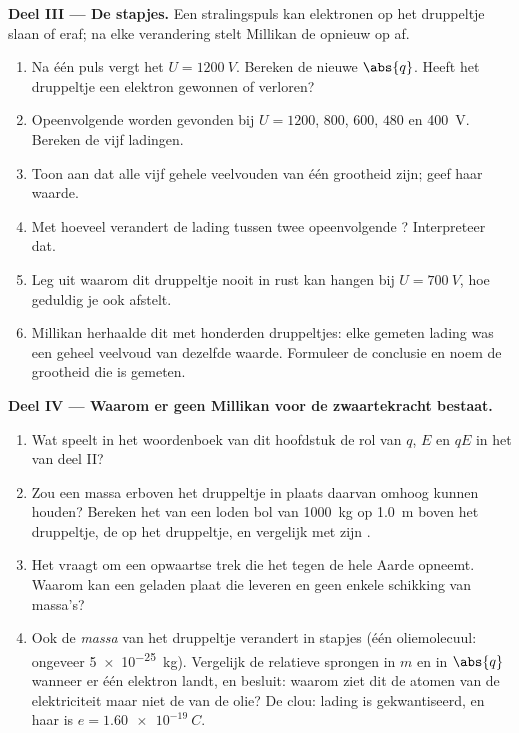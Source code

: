 \begin{problem}
\medskip
\noindent\textbf{Deel III --- De stapjes.}
Een stralingspuls kan elektronen op het druppeltje slaan of eraf; na elke
verandering stelt Millikan de  opnieuw op  af.
\begin{enumerate}[resume]
  \item Na één puls vergt het  $U = \qty{1200}{V}$. Bereken de
        nieuwe $\abs{q}$. Heeft het druppeltje een elektron gewonnen of
        verloren?
  \item Opeenvolgende  worden gevonden bij $U = 1200$, $800$,
        $600$, $480$ en \qty{400}{V}. Bereken de vijf ladingen.
  \item Toon aan dat alle vijf gehele veelvouden van één grootheid zijn;
        geef haar waarde.
  \item Met hoeveel verandert de lading tussen twee opeenvolgende
        ? Interpreteer dat.
  \item Leg uit waarom dit druppeltje nooit in rust kan hangen bij
        $U = \qty{700}{V}$, hoe geduldig je ook afstelt.
  \item Millikan herhaalde dit met honderden druppeltjes: elke gemeten
        lading was een geheel veelvoud van dezelfde waarde. Formuleer de
        conclusie en noem de grootheid die is gemeten.
\end{enumerate}

\medskip
\noindent\textbf{Deel IV --- Waarom er geen Millikan voor de
zwaartekracht bestaat.}
\begin{enumerate}[resume]
  \item Wat speelt in het woordenboek van dit hoofdstuk de rol van $q$,
        $E$ en $qE$ in het  van deel II?
  \item Zou een massa erboven het druppeltje in plaats daarvan omhoog
        kunnen houden? Bereken het  van een loden bol van
        \qty{1000}{kg} op \qty{1.0}{m} boven het druppeltje, de  op
        het druppeltje, en vergelijk met zijn .
  \item Het  vraagt om een opwaartse trek die het tegen de hele
        Aarde opneemt. Waarom kan een geladen plaat die leveren en geen
        enkele schikking van massa's?
  \item Ook de \emph{massa} van het druppeltje verandert in stapjes (één
        oliemolecuul: ongeveer \qty{5e-25}{kg}). Vergelijk de relatieve
        sprongen in $m$ en in $\abs{q}$ wanneer er één elektron landt, en
        besluit: waarom ziet dit  de atomen van de
        elektriciteit maar niet de  van de olie? De clou: lading
        is gekwantiseerd, en haar  is $e = \qty{1.60e-19}{C}$.
\end{enumerate}
\end{problem}
